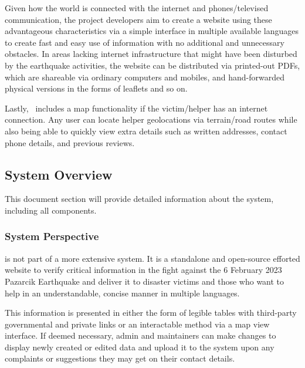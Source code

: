 Given how the world is connected with the internet and phones/televised communication, the project developers aim to create a website using these advantageous characteristics via a simple interface in multiple available languages to create fast and easy use of information with no additional and unnecessary obstacles. In areas lacking internet infrastructure that might have been disturbed by the earthquake activities, the website can be distributed via printed-out PDFs, which are shareable via ordinary computers and mobiles, and hand-forwarded physical versions in the forms of leaflets and so on.

Lastly, \afetbilgi\ includes a map functionality if the victim/helper has an internet connection. Any user can locate helper geolocations via terrain/road routes while also being able to quickly view extra details such as written addresses, contact phone details, and previous reviews.

\subsection{System Overview}

This document section will provide detailed information about the system, including all components.

\subsubsection{System Perspective}

\afetbilgi \cite{afetbilgi} is not part of a more extensive system. It is a standalone and open-source efforted website to verify critical information in the fight against the 6 February 2023 Pazarcik Earthquake and deliver it to disaster victims and those who want to help in an understandable, concise manner in multiple languages.

This information is presented in either the form of legible tables with third-party governmental and private links or an interactable method via a map view interface. If deemed necessary, admin and maintainers can make changes to display newly created or edited data and upload it to the system upon any complaints or suggestions they may get on their contact details.


